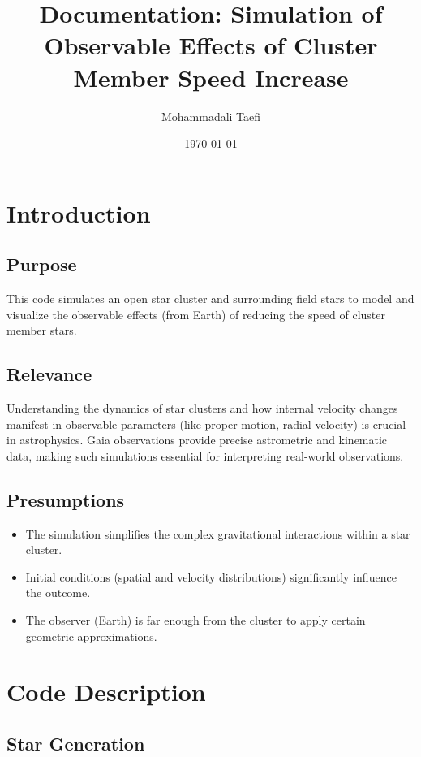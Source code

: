 \documentclass{article}
\title{Documentation: Simulation of Observable Effects of Cluster Member Speed Increase}
\author{Mohammadali Taefi}
\date{\today}
\begin{document}
	
	\maketitle
	
	\section{Introduction}
	
	\subsection{Purpose}
	
	This code simulates an open star cluster and surrounding field stars to model and visualize the observable effects (from Earth) of reducing the speed of cluster member stars. 
	
	\subsection{Relevance}
	
	Understanding the dynamics of star clusters and how internal velocity changes manifest in observable parameters (like proper motion, radial velocity) is crucial in astrophysics. Gaia observations provide precise astrometric and kinematic data, making such simulations essential for interpreting real-world observations.
	
	\subsection{Presumptions}
	
	\begin{itemize}
		\item The simulation simplifies the complex gravitational interactions within a star cluster.
		\item Initial conditions (spatial and velocity distributions) significantly influence the outcome.
		\item The observer (Earth) is far enough from the cluster to apply certain geometric approximations.
	\end{itemize}
	
	\section{Code Description}
	
	\subsection{Star Generation}
	
\end{document}
